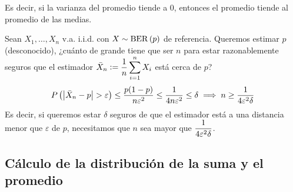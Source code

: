 Es decir, si la varianza del promedio tiende a 0, entonces el promedio tiende al promedio de las medias.

 Sean $X_1, \ldots, X_n$ v.a. i.i.d. con $X\sim \operatorname{BER}\left(p\right)$ de referencia. Queremos estimar $p$ (desconocido), ¿cuánto de grande tiene que ser $n$ para estar razonablemente seguros que el estimador $\displaystyle \Bar{X}_n \vcentcolon= \frac{1}{n}\sum_{i=1}^{n} X_i$ está cerca de $p$?
\[P\left(\left|\Bar{X}_n - p\right| > \varepsilon\right) \leq \frac{p(1-p)}{n\varepsilon^2} \leq \frac{1}{4n\varepsilon^2} \leq \delta \implies n \geq \frac{1}{4\varepsilon^2\delta}\]
Es decir, si queremos estar $\delta$ seguros de que el estimador está a una distancia menor que $\varepsilon$ de $p$, necesitamos que $n$ sea mayor que $\displaystyle \frac{1}{4\varepsilon^2\delta}$.

\subsection{Cálculo de la distribución de la suma y el promedio}

